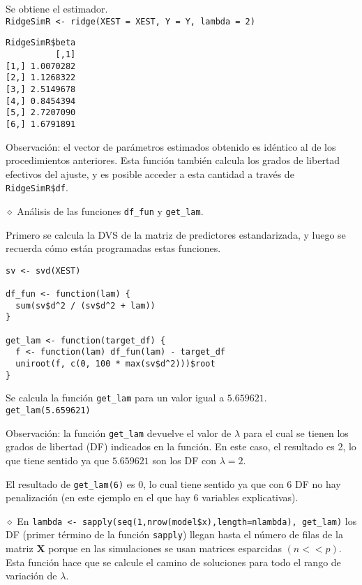 \documentclass[a4paper,12pt]{report}
\begin{document}
Se obtiene el estimador.\\
\texttt{RidgeSimR <- ridge(XEST = XEST, Y = Y, lambda = 2)}

{
\begin{verbatim}
RidgeSimR$beta
          [,1]
[1,] 1.0070282
[2,] 1.1268322
[3,] 2.5149678
[4,] 0.8454394
[5,] 2.7207090
[6,] 1.6791891
\end{verbatim}
}

Observación: el vector de parámetros estimados obtenido es idéntico al de los procedimientos anteriores. Esta función también calcula los grados de libertad efectivos del ajuste, y es posible acceder a esta cantidad a través de \texttt{RidgeSimR\$df}.

\vspace{0.4cm}
$\diamond$ Análisis de las funciones \texttt{df\_fun} y \texttt{get\_lam}.

Primero se calcula la DVS de la matriz de predictores estandarizada, y luego se recuerda cómo están programadas estas funciones.

{
\begin{verbatim}
sv <- svd(XEST)

df_fun <- function(lam) {
  sum(sv$d^2 / (sv$d^2 + lam))
}

get_lam <- function(target_df) {
  f <- function(lam) df_fun(lam) - target_df
  uniroot(f, c(0, 100 * max(sv$d^2)))$root
}
\end{verbatim}
}

Se calcula la función \texttt{get\_lam} para un valor igual a $5.659621$.\\
\texttt{get\_lam(5.659621)}

Observación: la función \texttt{get\_lam} devuelve el valor de $\lambda$ para el cual se tienen los grados de libertad (DF) indicados en la función. En este caso, el resultado es 2, lo que tiene sentido ya que $5.659621$ son los DF con $\lambda=2$.

El resultado de \texttt{get\_lam(6)} es 0, lo cual tiene sentido ya que con 6 DF no hay penalización (en este ejemplo en el que hay 6 variables explicativas).

\vspace{0.4cm}
$\diamond$ En \texttt{lambda <- sapply(seq(1,nrow(model\$x),length=nlambda), get\_lam)} los DF (primer término de la función \texttt{sapply}) llegan hasta el número de filas de la matriz $\boldsymbol{X}$ porque en las simulaciones se usan matrices esparcidas $(n <<p)$. Esta función hace que se calcule el camino de soluciones para todo el rango de variación de $\lambda$.
\end{document}
